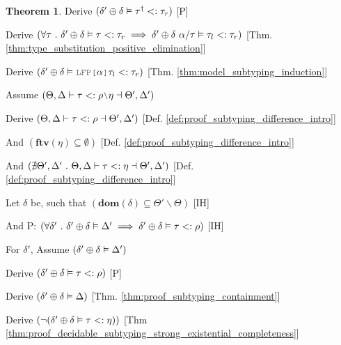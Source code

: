 \documentclass[acmsmall]{acmart}
\theoremstyle{definition}
\newtheorem{theorem}{Theorem}[section]
\begin{document}
\begin{theorem}
  \item \I\I \N Derive $(
    \delta' \oplus \delta \vDash \tau^\dagger <: \tau_r
  )$ [P]

  \item \I\I \N Derive $(
    \forall \tau \ .\  \delta' \oplus \delta \vDash \tau <: \tau_r \implies \delta' \oplus \delta\ \alpha \slash \tau \vDash \tau_l <: \tau_r
  )$ [Thm. \ref{thm:type_substitution_positive_elimination}]

  \item \I\I \N Derive $(
    \delta' \oplus \delta \satisfies \J{LFP[}\alpha\J{]}\tau_l \subtypes \tau_r
  )$ [Thm. \ref{thm:model_subtyping_induction}]


  \item \N Assume $(
    \Theta, \Delta \entails 
    \tau \subtypes \rho \typdiff \eta
    \given \Theta', \Delta'
  )$
  \item \I \N Derive $(
    \Theta, \Delta \vdash 
    \tau <: \rho \dashv \Theta', \Delta' 
  )$ [Def. \ref{def:proof_subtyping_difference_intro}]
  \item \I \N And $(
    \textbf{ftv}(\eta) \subseteq \emptyset
  )$ [Def. \ref{def:proof_subtyping_difference_intro}]
  \item \I \N And $(
    \nexists \Theta', \Delta' \ .\   
    \Theta, \Delta \vdash 
    \tau <: \eta \dashv \Theta', \Delta'
  )$ [Def. \ref{def:proof_subtyping_difference_intro}]

  \item \I \N Let $\delta$ be, such that $(
    \textbf{dom}(\delta) \subseteq \Theta' \backslash \Theta
  )$ [IH]

  \item \I \N And P: $(
    \forall \delta' \ .\ 
    \delta' \oplus \delta \vDash \Delta'
    \implies
    \delta' \oplus \delta \vDash \tau <: \rho
  )$ [IH]

  \item \I \N For $\delta'$, Assume $(
    \delta' \oplus \delta \vDash \Delta'
  )$

  \item \I\I \N Derive $(
    \delta' \oplus \delta \vDash \tau <: \rho
  )$ [P]

  \item \I\I \N Derive $(
    \delta' \oplus \delta \vDash \Delta
  )$ [Thm. \ref{thm:proof_subtyping_containment}]

  \item \I\I \N Derive $(
    \neg (\delta' \oplus \delta \vDash \tau <: \eta)
  )$ [Thm \ref{thm:proof_decidable_subtyping_strong_existential_completeness}]


\end{theorem}
\end{document}
